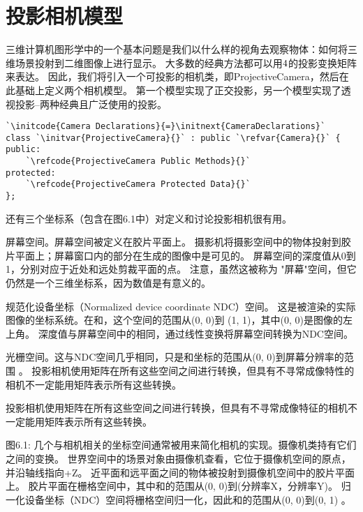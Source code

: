 \section{投影相机模型}\label{sec:相机模型}

三维计算机图形学中的一个基本问题是我们以什么样的视角去观察物体：如何将三维场景投射到二维图像上进行显示。
大多数的经典方法都可以用$4 \time 4$的投影变换矩阵来表达。
因此，我们将引入一个可投影的相机类，即ProjectiveCamera，然后在此基础上定义两个相机模型。
第一个模型实现了正交投影，另一个模型实现了透视投影--两种经典且广泛使用的投影。

\begin{lstlisting}
`\initcode{Camera Declarations}{=}\initnext{CameraDeclarations}`
class `\initvar{ProjectiveCamera}{}` : public `\refvar{Camera}{}` {
public:
    `\refcode{ProjectiveCamera Public Methods}{}`
protected:
    `\refcode{ProjectiveCamera Protected Data}{}`
};
\end{lstlisting}

还有三个坐标系（包含在图6.1中）对定义和讨论投影相机很有用。

屏幕空间。屏幕空间被定义在胶片平面上。
摄影机将摄影空间中的物体投射到胶片平面上；屏幕窗口内的部分在生成的图像中是可见的。
屏幕空间的深度值从0到1，分别对应于近处和远处剪裁平面的点。
注意，虽然这被称为 "屏幕"空间，但它仍然是一个三维坐标系，因为数值是有意义的。

规范化设备坐标（Normalized device coordinate NDC）空间。
这是被渲染的实际图像的坐标系统。在和，这个空间的范围从(0, 0)到 (1, 1)，其中(0, 0)是图像的左上角。
深度值与屏幕空间中的相同，通过线性变换将屏幕空间转换为NDC空间。

光栅空间。这与NDC空间几乎相同，只是和坐标的范围从(0, 0)到屏幕分辨率的范围 。
投影相机使用矩阵在所有这些空间之间进行转换，但具有不寻常成像特性的相机不一定能用矩阵表示所有这些转换。

投影相机使用矩阵在所有这些空间之间进行转换，但具有不寻常成像特征的相机不一定能用矩阵表示所有这些转换。

图6.1: 几个与相机相关的坐标空间通常被用来简化相机的实现。摄像机类持有它们之间的变换。
世界空间中的场景对象由摄像机查看，它位于摄像机空间的原点，并沿轴线指向+Z。
近平面和远平面之间的物体被投射到摄像机空间中的胶片平面上。
胶片平面在栅格空间中，其中和的范围从(0, 0)到(分辨率X，分辨率Y)。
归一化设备坐标（NDC）空间将栅格空间归一化，因此和的范围从(0, 0)到(0, 1) 。

